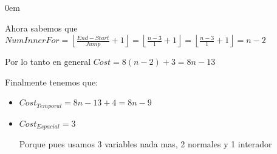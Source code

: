 \documentclass[12pt, fleqn]{article}                            %
\newenvironment{SmallIndentation}[1][0.75em]                    %
        {\begin{adjustwidth}{#1}{}\begin{footnotesize}}             %
        {\end{footnotesize}\end{adjustwidth}}                       %
\theoremstyle{break}                                            %
\newcommand{\Floor}[1]{\left \lfloor #1 \right \rfloor}         %
\begin{document}
\begin{SmallIndentation}[0em]
\begin{enumerate}
                Ahora sabemos que 
                $NumInnerFor 
                    = \Floor{\frac{End - Start}{Jump} + 1}
                    = \Floor{\frac{n - 3}{1} + 1}
                    = \Floor{\frac{n-3}{1} + 1}
                    = n-2$

                Por lo tanto en general $Cost = 8(n-2)+3 = 8n - 13$

        \end{enumerate}

        Finalmente tenemos que:
        \begin{itemize}
            \item $Cost_{Temporal} = 8n - 13 + 4 = 8n - 9$
            \item $Cost_{Espacial} = 3$

                Porque pues usamos 3 variables nada mas, 2 normales y 1 interador
        \end{itemize}
            
    \end{SmallIndentation}




    \clearpage
\end{document}

